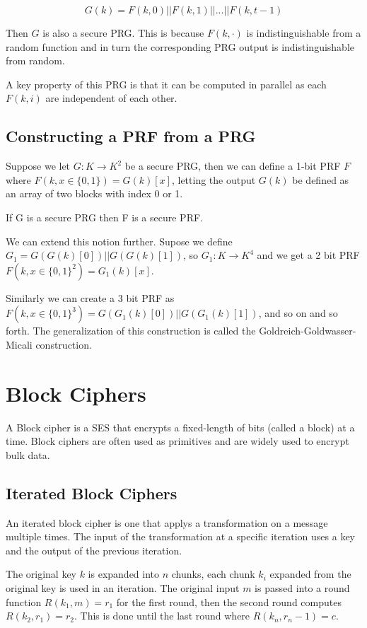 \documentclass{article}
\begin{document}
\begin{multicols}{2}
$$
G(k) = F(k,0) || F(k,1) || ... || F(k,t-1)
$$

Then $G$ is also a secure PRG. This is because $F(k,\cdot)$ is indistinguishable from a random function and in turn the corresponding PRG output is indistinguishable from random.

A key property of this PRG is that it can be computed in parallel as each $F(k,i)$ are independent of each other.

\subsection{Constructing a PRF from a PRG}

Suppose we let $G: K \rightarrow K^2$ be a secure PRG, then we can define a 1-bit PRF $F$ where $F(k,x \in \{0,1\}) = G(k)[x]$, letting the output $G(k)$ be defined as an array of two blocks with index 0 or 1.

If G is a secure PRG then F is a secure PRF. %

We can extend this notion further. Supose we define $G_1 = G(G(k)[0])||G(G(k)[1])$, so $G_1: K \rightarrow K^4$ and we get a 2 bit PRF $F(k, x \in \{0,1\}^2) = G_1(k)[x]$.

Similarly we can create a 3 bit PRF as $F(k, x \in \{0,1\}^3) = G(G_1(k)[0])||G(G_1(k)[1])$, and so on and so forth. The generalization of this construction is called the Goldreich-Goldwasser-Micali construction.

\section{Block Ciphers}

A Block cipher is a SES that encrypts a fixed-length of bits (called a block) at a time. Block ciphers are often used as primitives and are widely used to encrypt bulk data.

\subsection{Iterated Block Ciphers}

An iterated block cipher is one that applys a transformation on a message multiple times. The input of the transformation at a specific iteration uses a key and the output of the previous iteration. 

The original key $k$ is expanded into $n$ chunks, each chunk $k_i$ expanded from the original key is used in an iteration. The original input $m$ is passed into a round function $R(k_1,m) = r_1$ for the first round, then the second round computes $R(k_2,r_1) = r_2$. This is done until the last round where $R(k_n, r_n-1) =c$.


\end{multicols}
\end{document}
